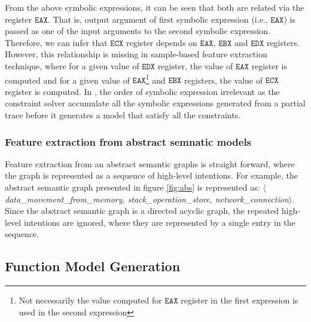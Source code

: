 From the above symbolic expressions, it can be seen that both are related via the register $\mathtt{EAX}$. That is, output argument of first symbolic expression (i.e., $\mathtt{EAX}$) is passed as one of the input arguments to the second symbolic expression. Therefore, we can infer that $\mathtt{ECX}$ register depends on $\mathtt{EAX}$, $\mathtt{EBX}$ and $\mathtt{EDX}$ registers. However, this relationship is missing in sample-based feature extraction technique, where for a given value of $\mathtt{EDX}$ register, the value of $\mathtt{EAX}$ register is computed and for a given value of $\mathtt{EAX}$\footnote{Not necessarily the value computed for $\mathtt{EAX}$ register in the first expression is used in the second expression} and $\mathtt{EBX}$ registers, the value of $\mathtt{ECX}$ register is computed. In \tool, the order of symbolic expression irrelevant as the constraint solver accumulate all the symbolic expressions generated from a partial trace before it generates a model that satisfy all the constraints.

\subsubsection{Feature extraction from abstract semnatic models} \label{subsubsec:abs_sem_mod_fe}
Feature extraction from an abstract semantic graphs is straight forward, where the graph is represented as a sequence of high-level intentions. For example, the abstract semantic graph presented in figure \ref{fig:abs} is represented as: $\langle$\textit{data\_movement\_from\_memory, stack\_operation\_store, network\_connection}$\rangle$. Since the abstract semantic graph is a directed acyclic graph, the repeated high-level intentions are ignored, where they are represented by a single entry in the sequence.

\subsection{Function Model Generation} \label{subsec:fun_mod}


